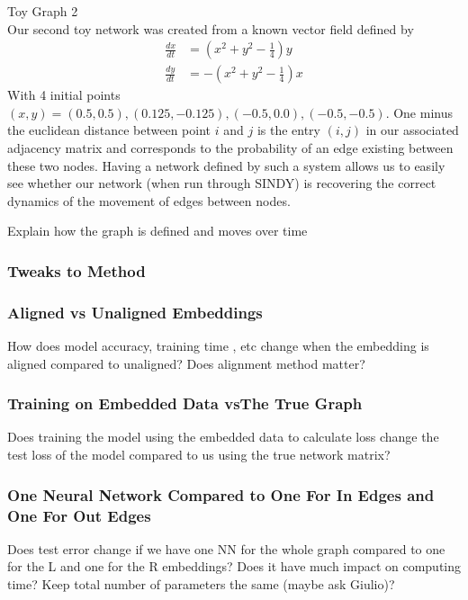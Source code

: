 \documentclass[12pt]{article}
\begin{document}
            
            Toy Graph 2\\
                Our second toy network was created from a known vector field defined by
                \begin{align}
                    \frac{dx}{dt} &= (x^2+y^2-\frac14)y\\
                    \frac{dy}{dt} &= -(x^2+y^2-\frac14)x
                \end{align}
                With 4 initial points $(x,y)=(0.5,0.5), (0.125, -0.125), (-0.5, 0.0), (-0.5, -0.5)$. One minus the euclidean distance between point $i$ and $j$ is the entry $(i,j)$ in our associated adjacency matrix and corresponds to the probability of an edge existing between these two nodes. Having a network defined by such a system allows us to easily see whether our network (when run through SINDY) is recovering the correct dynamics of the movement of edges between nodes.

            
            
            
            
            
            Explain how the graph is defined and moves over time
        \subsubsection{Tweaks to Method}
            \subsubsection{Aligned vs Unaligned Embeddings}
                How does model accuracy, training time , etc change when the embedding is aligned compared to unaligned? Does alignment method matter?
            \subsubsection{Training on Embedded Data vsThe True Graph}
                Does training the model using the embedded data to calculate loss change the test loss of the model compared to us using the true network matrix?
            \subsubsection{One Neural Network Compared to One For In Edges and One For Out Edges}
                Does test error change if we have one NN for the whole graph compared to one for the L and one for the R embeddings? Does it have much impact on computing time? Keep total number of parameters the same (maybe ask Giulio)?
\end{document}
